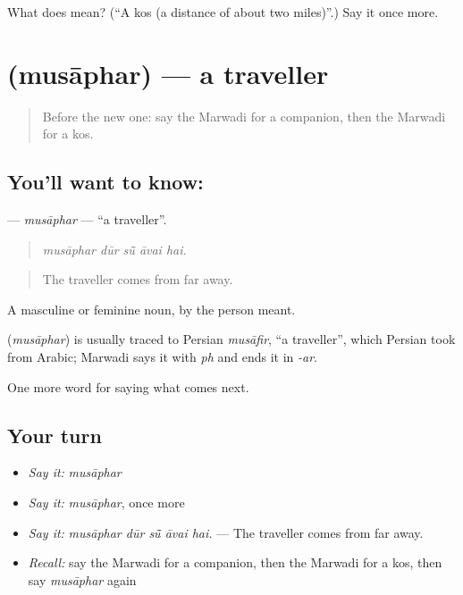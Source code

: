 \begin{tcolorbox}[breakable,colback=teal!4,colframe=teal!35!black,title={Before you move on}]
What does  mean? (\textquotedblleft{}A kos (a distance of about two miles)\textquotedblright{}.) Say it once more.
\end{tcolorbox}
\section[\texorpdfstring{\mw{मुसाफर} (musāphar)}{मुसाफर (musāphar)}]{ (musāphar) — a traveller}

\label{lesson:MW-C216-musaphar}



\begin{quote}
Before the new one: say the Marwadi for a companion, then the Marwadi for a kos.
\end{quote}

\subsection*{You'll want to know: }
\textbf{} — \emph{musāphar} — \textquotedblleft{}a traveller\textquotedblright{}.

\begin{quote}
    
\end{quote}

\begin{quote}
\emph{musāphar dūr sū̃ āvai hai.}
\end{quote}

\begin{quote}
The traveller comes from far away.
\end{quote}

A masculine or feminine noun, by the person meant.

\begin{cousinweb}
\textbf{} (\emph{musāphar}) is usually traced to Persian \emph{musāfir}, \textquotedblleft{}a traveller\textquotedblright{}, which Persian took from Arabic; Marwadi says it with \emph{ph} and ends it in \emph{-ar}.
\end{cousinweb}

\begin{grammarlens}[title={What you've built}]
One more word for saying what comes next.
\end{grammarlens}

\subsection*{Your turn}
\begin{itemize}
\raggedright
  \item \emph{Say it:} \emph{musāphar}
  \item \emph{Say it:} \emph{musāphar}, once more
  \item \emph{Say it:} \emph{musāphar dūr sū̃ āvai hai.} — The traveller comes from far away.
  \item \emph{Recall:} say the Marwadi for a companion, then the Marwadi for a kos, then say \emph{musāphar} again
\end{itemize}

